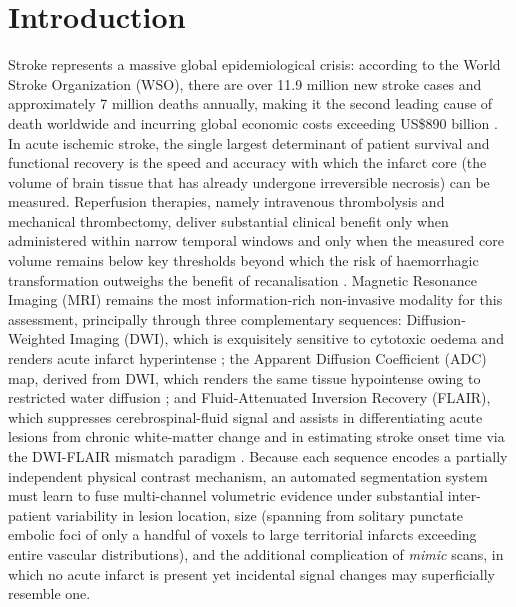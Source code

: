 \documentclass[pdflatex,sn-mathphys-num]{sn-jnl}
\begin{document}
\section{Introduction}\label{sec:intro}

Stroke represents a massive global epidemiological crisis: according to the World Stroke Organization (WSO), there are over 11.9 million new stroke cases and approximately 7 million deaths annually, making it the second leading cause of death worldwide and incurring global economic costs exceeding US\$890 billion \citep{feigin2022global,who2023stroke}. In acute ischemic stroke, the single largest determinant of patient survival and functional recovery is the speed and accuracy with which the infarct core (the volume of brain tissue that has already undergone irreversible necrosis) can be measured. Reperfusion therapies, namely intravenous thrombolysis and mechanical thrombectomy, deliver substantial clinical benefit only when administered within narrow temporal windows and only when the measured core volume remains below key thresholds beyond which the risk of haemorrhagic transformation outweighs the benefit of recanalisation \citep{campbell2019endovascular}. Magnetic Resonance Imaging (MRI)
remains the most information-rich non-invasive modality for this
assessment, principally through three complementary sequences:
Diffusion-Weighted Imaging (DWI), which is exquisitely sensitive to
cytotoxic oedema and renders acute infarct hyperintense \citep{gonzalez1999diffusion};
the Apparent Diffusion Coefficient (ADC) map, derived from DWI, which renders the
same tissue hypointense owing to restricted water diffusion \citep{warach1995acute};
and Fluid-Attenuated Inversion Recovery (FLAIR), which suppresses
cerebrospinal-fluid signal and assists in differentiating acute
lesions from chronic white-matter change and in estimating stroke
onset time via the DWI-FLAIR mismatch paradigm \citep{thomalla2011dwi,thomalla2018mri}. Because each sequence encodes a partially independent
physical contrast mechanism, an automated segmentation system must
learn to fuse multi-channel volumetric evidence under substantial
inter-patient variability in lesion location, size (spanning from
solitary punctate embolic foci of only a handful of voxels to
large territorial infarcts exceeding entire vascular distributions),
and the additional complication of \textit{mimic} scans, in which
no acute infarct is present yet incidental signal changes may
superficially resemble one.
\end{document}
